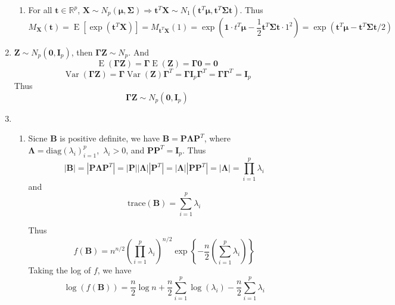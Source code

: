 \documentclass{article}
\DeclareMathOperator{\Var}{Var}
\DeclareMathOperator{\E}{E}
\begin{document}
\begin{enumerate}[leftmargin = 0 em, label = \arabic*., font = \bfseries]
\begin{enumerate}
	\item 
	For all $\bm t \in \mathbb{R}^p$, $\bm X \sim N_p(\bm \mu, \bm \Sigma) \Rightarrow \bm t^T\bm X \sim N_1(\bm t^T \bm \mu, \bm t^T \bm \Sigma \bm t)$. Thus
	\[M_{\bm X}(\bm t) = \E[\exp(\bm t^T \bm X)] = M_{\bm t^T \bm X}(1) = \exp(\bm 1 \cdot t^T\bm \mu - \frac{1}{2} \bm t^T \bm \Sigma \bm t \cdot 1^2) = \exp(\bm t^T\bm \mu - \bm t^T \bm \Sigma \bm t/2)\]
 	\end{enumerate}

 	\item 
	$\bm Z \sim N_{p}(\bm 0, \bm I_p)$, then $\bm \Gamma \bm Z \sim N_p$. And
	\[\E(\bm \Gamma \bm Z) = \bm \Gamma \E(\bm Z) = \bm \Gamma \bm 0 = \bm 0\]
 \[\Var(\bm \Gamma \bm Z) = \bm \Gamma \Var(\bm Z) \bm \Gamma^T = \bm \Gamma \bm I_p \bm \Gamma^T = \bm \Gamma \bm \Gamma^T = \bm I_p\]	
Thus 
\[\bm \Gamma \bm Z \sim N_p(\bm 0, \bm I_p)\]

\item 
\begin{enumerate}
	\item 
	Sicne $\bm B$ is positive definite, we have $\bm B = \bm P \bm \Lambda \bm P^T$, where $\bm \Lambda = \mathrm{diag}(\lambda_i)_{i=1}^p$,\, $\lambda_i > 0$, and $\bm P \bm P^T = \bm I_p$. Thus 
	\[|\bm B| = |\bm P \bm \Lambda \bm P^T| = |\bm P| |\bm \Lambda| |\bm P^T| = |\bm \Lambda| |\bm P \bm P^T| = |\bm \Lambda| = \prod_{i=1}^p \lambda_i\]
	and 
	\[\mathrm{trace}(\bm B) = \sum_{i=1}^p \lambda_i\]

	Thus 
	\[f(\bm B) = n^{n/2} \left(\prod_{i=1}^p \lambda_i\right)^{n/2} \exp\left\{-\frac{n}{2} \left(\sum_{i=1}^p \lambda_i\right)\right\}\]
	Taking the log of $f$, we have
	\[\log(f(\bm B)) = \frac{n}{2} \log n + \frac{n}{2} \sum_{i=1}^p\log(\lambda_i) - \frac{n}{2} \sum_{i=1}^p \lambda_i\]


\end{enumerate}
\end{enumerate}
\end{document}
